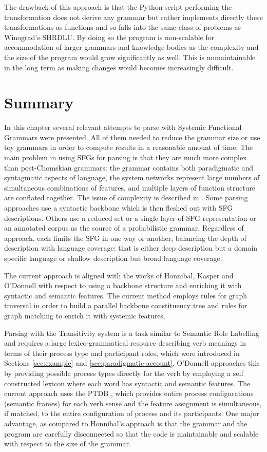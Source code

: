     The drawback of this approach is that the Python script performing the transformation does not derive any grammar but rather implements directly these transformations as functions and so falls into the same class of problems as Winograd's SHRDLU. By doing so the program is non-scalable for accommodation of larger grammars and knowledge bodies as the complexity and the size of the program would grow significantly as well. This is unmaintainable in the long term as making changes would becomes increasingly difficult.

\section{Summary}
    In this chapter several relevant attempts to parse with Systemic Functional Grammars were presented. All of them needed to reduce the grammar size or use toy grammars in order to compute results in a reasonable amount of time. The main problem in using SFGs for parsing is that they are much more complex than post-Chomskian grammars: the grammar contains both paradigmatic and syntagmatic aspects of language, the system networks represent large numbers of simultaneous combinations of features, and multiple layers of function structure are conflated together. The issue of complexity is described in \citep{Bateman2008}. 
    Some parsing approaches use a syntactic backbone which is then fleshed out with SFG descriptions. Others use a reduced set or a single layer of SFG representation or an annotated corpus as the source of a probabilistic grammar. Regardless of approach, each limits the SFG in one way or another, balancing the depth of description with language coverage: that is either deep description but a domain specific language or shallow description but broad language coverage. 

    The current approach is aligned with the works of Honnibal, Kasper and O'Donnell with respect to using a backbone structure and enriching it with syntactic and semantic features. The current method employs rules for graph traversal in order to build a parallel backbone constituency tree and rules for graph matching to enrich it with systemic features. 
    
    Parsing with the Transitivity system is a task similar to Semantic Role Labelling and requires a large lexico-grammatical resource describing verb meanings in terms of their process type and participant roles, which were introduced in Sections \ref{sec:example} and \ref{sec:paradigmatic-account}. O'Donnell approaches this by providing possible process types directly for the verb by employing a self constructed lexicon where each word has syntactic and semantic features. The current approach uses the PTDB \citep{Neale2002}, which provides entire process configurations (semantic frames) for each verb sense and the feature assignment is simultaneous, if matched, to the entire configuration of process and its participants.
    One major advantage, as compared to Honnibal's approach is that the grammar and the program are carefully disconnected so that the code is maintainable and scalable with respect to the size of the grammar. 

